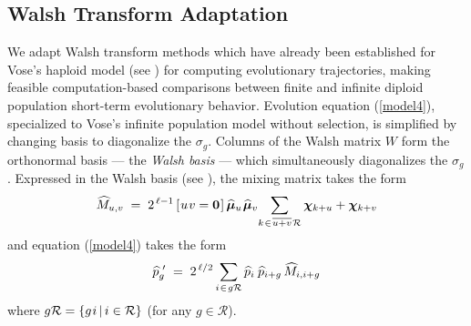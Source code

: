 \subsection{Walsh Transform Adaptation}
 We adapt Walsh transform methods which have already been
established for Vose's haploid model (see \cite{VoseWright1998})
for computing evolutionary trajectories, making feasible
computation-based comparisons between finite and infinite
diploid population short-term evolutionary behavior.
Evolution equation (\ref{model4}), 
specialized to Vose's infinite population model without selection, 
is simplified by changing basis to diagonalize the $\sigma_g$.
Columns of the Walsh matrix $W$ form the orthonormal basis --- the
{\em Walsh basis\/} --- which simultaneously diagonalizes the
$\sigma_g$. Expressed in the Walsh basis (see \cite{VoseWright1998}), the mixing matrix
takes the form
\begin{equation}
\label{Mhat}
\widehat{M}_{u,v} \; = \; 2^{\,\ell-1} \,[\hspace{0.01in} u \hspace{0.01in} v = {\bf
    0}\hspace{0.01in}]\, \widehat{\bm{\mu}}_u \hspace{0.01in} \widehat{\bm{\mu}}_v \!  \sum_{k
  \hspace{0.01in} \in \hspace{0.01in} \overline{u+v} \hspace{0.01in} \mathcal{R}} \bm{\chi}_{k + u} +
\bm{\chi}_{k + v}
\end{equation}
and equation (\ref{model4}) takes the form
\begin{equation}
\label{model5}
\widehat{p}_g^{\,\,\prime} \; = \; 2^{\,\ell/2} \sum_{i \hspace{0.01in} \in \hspace{0.01in} g \mathcal{R}}
\widehat{p}_i \, \hspace{0.01in} \widehat{p}_{i+g} \,\widehat{M}_{i,i+g}
\end{equation}
where $g \mathcal{R} = \{g \hspace{0.01in} i \, | \, i \in \mathcal{R} \}$ (for
any $g \in \mathcal{R}$).

